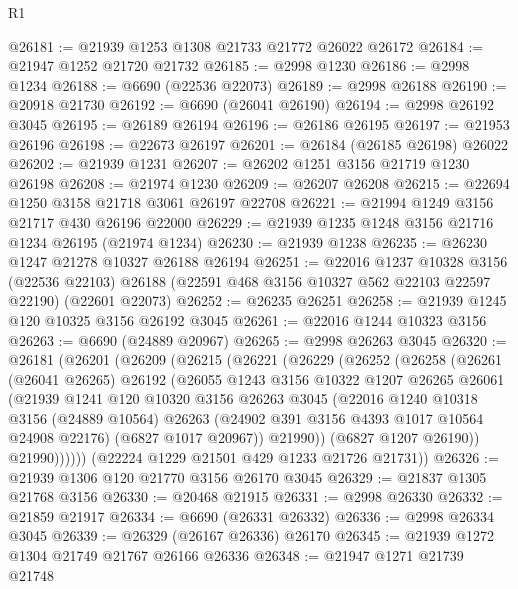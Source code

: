 \begin{lexlean}{R1}
\begin{coremodule}
@26181 := @21939 @1253 @1308 @21733 @21772 @26022 @26172
@26184 := @21947 @1252 @21720 @21732
@26185 := @2998 @1230
@26186 := @2998 @1234
@26188 := @6690 (@22536 @22073)
@26189 := @2998 @26188
@26190 := @20918 @21730
@26192 := @6690 (@26041 @26190)
@26194 := @2998 @26192 @3045
@26195 := @26189 @26194
@26196 := @26186 @26195
@26197 := @21953 @26196
@26198 := @22673 @26197
@26201 := @26184 (@26185 @26198) @26022
@26202 := @21939 @1231
@26207 := @26202 @1251 @3156 @21719 @1230 @26198
@26208 := @21974 @1230
@26209 := @26207 @26208
@26215 := @22694 @1250 @3158 @21718 @3061 @26197 @22708
@26221 := @21994 @1249 @3156 @21717 @430 @26196 @22000
@26229 := @21939 @1235 @1248 @3156 @21716 @1234 @26195 (@21974 @1234)
@26230 := @21939 @1238
@26235 := @26230 @1247 @21278 @10327 @26188 @26194
@26251 := @22016
    @1237
    @10328
    @3156
    (@22536 @22103)
    @26188
    (@22591 @468 @3156 @10327 @562 @22103 @22597 @22190)
    (@22601 @22073)
@26252 := @26235 @26251
@26258 := @21939 @1245 @120 @10325 @3156 @26192 @3045
@26261 := @22016 @1244 @10323 @3156
@26263 := @6690 (@24889 @20967)
@26265 := @2998 @26263 @3045
@26320 := @26181
    (@26201
      (@26209
        (@26215
          (@26221
            (@26229
              (@26252
                (@26258
                  (@26261
                    (@26041 @26265)
                    @26192
                    (@26055
                      @1243
                      @3156
                      @10322
                      @1207
                      @26265
                      @26061
                      (@21939
                        @1241
                        @120
                        @10320
                        @3156
                        @26263
                        @3045
                        (@22016
                          @1240
                          @10318
                          @3156
                          (@24889 @10564)
                          @26263
                          (@24902 @391 @3156 @4393 @1017 @10564 @24908 @22176)
                          (@6827 @1017 @20967))
                        @21990))
                    (@6827 @1207 @26190))
                  @21990))))))
      (@22224 @1229 @21501 @429 @1233 @21726 @21731))
@26326 := @21939 @1306 @120 @21770 @3156 @26170 @3045
@26329 := @21837 @1305 @21768 @3156
@26330 := @20468 @21915
@26331 := @2998 @26330
@26332 := @21859 @21917
@26334 := @6690 (@26331 @26332)
@26336 := @2998 @26334 @3045
@26339 := @26329 (@26167 @26336) @26170
@26345 := @21939 @1272 @1304 @21749 @21767 @26166 @26336
@26348 := @21947 @1271 @21739 @21748

\end{coremodule}
\end{lexlean}
